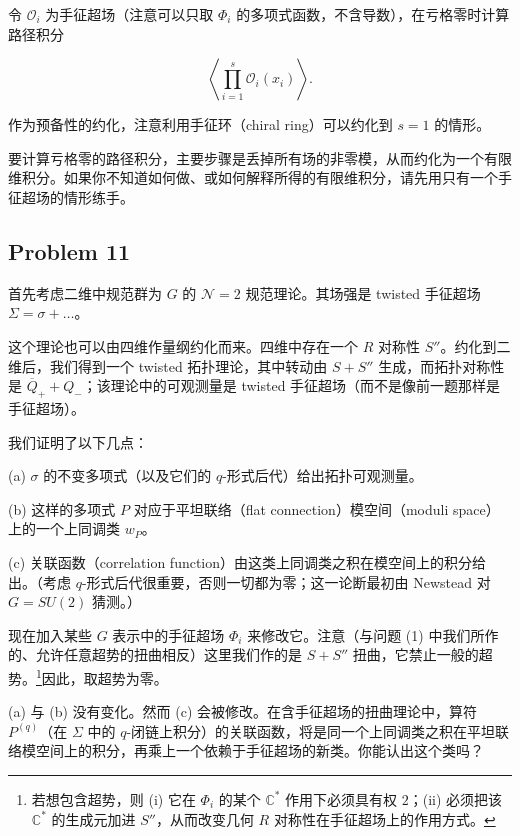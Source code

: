 令 $\mathcal{O}_i$ 为手征超场（注意可以只取 $\Phi_i$ 的多项式函数，不含导数），在亏格零时计算路径积分

\begin{equation}
  \tag{10}
  \label{eq:ex-10}
  \left\langle\prod_{i=1}^{s}\mathcal{O}_i(x_i)\right\rangle .
\end{equation}

作为预备性的约化，注意利用手征环（chiral ring）可以约化到 $s=1$ 的情形。

要计算亏格零的路径积分，主要步骤是丢掉所有场的非零模，从而约化为一个有限维积分。如果你不知道如何做、或如何解释所得的有限维积分，请先用只有一个手征超场的情形练手。

\subsection*{Problem 11}

首先考虑二维中规范群为 $G$ 的 $\mathcal{N}=2$ 规范理论。其场强是 twisted 手征超场 $\Sigma=\sigma+\dots$。


这个理论也可以由四维作量纲约化而来。四维中存在一个 $R$ 对称性 $S''$。约化到二维后，我们得到一个 twisted 拓扑理论，其中转动由 $S+S''$ 生成，而拓扑对称性是 $\overline{Q}_++Q_-$；该理论中的可观测量是 twisted 手征超场（而不是像前一题那样是手征超场）。

我们证明了以下几点：

(a) $\sigma$ 的不变多项式（以及它们的 $q$-形式后代）给出拓扑可观测量。

(b) 这样的多项式 $P$ 对应于平坦联络（flat connection）模空间（moduli space）上的一个上同调类 $w_P$。

(c) 关联函数（correlation function）由这类上同调类之积在模空间上的积分给出。（考虑 $q$-形式后代很重要，否则一切都为零；这一论断最初由 Newstead 对 $G=SU(2)$ 猜测。）

现在加入某些 $G$ 表示中的手征超场 $\Phi_i$ 来修改它。注意（与问题 (1) 中我们所作的、允许任意超势的扭曲相反）这里我们作的是 $S+S''$ 扭曲，它禁止一般的超势。\footnote{若想包含超势，则 (i) 它在 $\Phi_i$ 的某个 $\mathbb{C}^*$ 作用下必须具有权 $2$；(ii) 必须把该 $\mathbb{C}^*$ 的生成元加进 $S''$，从而改变几何 $R$ 对称性在手征超场上的作用方式。}因此，取超势为零。


(a) 与 (b) 没有变化。然而 (c) 会被修改。在含手征超场的扭曲理论中，算符 $P^{(q)}$（在 $\Sigma$ 中的 $q$-闭链上积分）的关联函数，将是同一个上同调类之积在平坦联络模空间上的积分，再乘上一个依赖于手征超场的新类。你能认出这个类吗？
